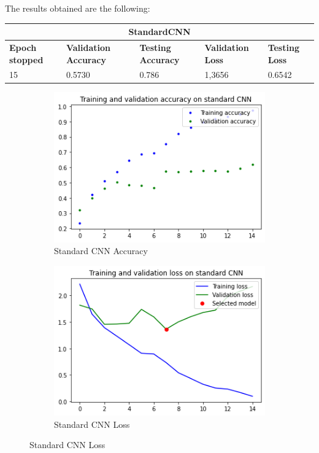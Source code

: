 \noindent The results obtained are the following:

\medskip

\begin{tabular}{ |p{2cm}|p{2cm}|p{2cm}|p{2cm}|p{2cm}|  }
\hline
\multicolumn{5}{|c|}{StandardCNN} \\
\hline
\textbf{Epoch stopped} & \textbf{Validation Accuracy} & \textbf{Testing Accuracy} & \textbf{Validation Loss} & \textbf{Testing Loss} \\
\hline
15 & 0.5730 & 0.786 & 1,3656 & 0.6542\\
\hline
\end{tabular}

\medskip


\begin{figure}[H]
	\begin{subfigure}{0.5\textwidth}
		\includegraphics[width=0.9\linewidth]{img/scratch/standardCNN_results_accuracy.png} 
		\caption{Standard CNN Accuracy}
		\label{fig:standardCNNacc}
	\end{subfigure}
	\begin{subfigure}{0.5\textwidth}
		\includegraphics[width=0.9\linewidth]{img/scratch/standardCNN_results_loss.png}
		\caption{Standard CNN Loss}
		\label{fig:standardCNNloss}
	\end{subfigure}
\end{figure}

